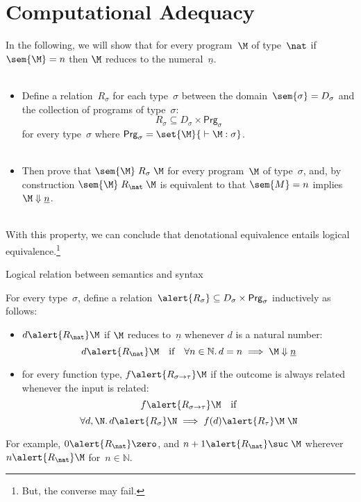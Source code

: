 \section{Computational Adequacy}
\begin{frame}
  In the following, we will show that for every program~$\M$ of type~$\nat$ if
  $\sem{\M} = n$ then $\M$ reduces to the numeral~$\underline{n}$.
  \\~\\
  \begin{itemize}
    \item Define a relation~$R_\sigma$ for each type~$\sigma$ between the
      domain~$\sem{\sigma} = D_\sigma$ and the collection of
      programs of type~$\sigma$:
      \[
        R_\sigma \subseteq D_\sigma \times \mathsf{Prg}_\sigma
      \]
      for every type~$\sigma$ where $\mathsf{Prg}_\sigma = \set{ \M }{{}\vdash
        \M : \sigma}$.
      \\~\\
    \item Then prove that $\sem{\M}\mathrel{R_\sigma} \M$ for every
      program~$\M$ of type~$\sigma$, and, by construction
      $\sem{\M} \mathrel{R_\nat} \M$ is equivalent to that
      $\sem{M} = n$ implies $\M \Downarrow \underline{n}$. 
  \end{itemize}
  ~\\

  With this property, we can conclude that denotational equivalence entails
  logical equivalence.\footnote{
    But, the converse may fail. 
  }
\end{frame}
\begin{frame}{Logical relation between semantics and syntax}
\begin{definition}
  For every type~$\sigma$, define a relation~$\alert{R_\sigma} \subseteq
  D_\sigma \times \mathsf{Prg}_\sigma$ inductively as follows:
  \begin{itemize}
    \item $d \alert{\mathrel{R_\nat}}\M$
      if $\M$ reduces to~$\underline{n}$
      whenever $d$ is a natural number:
      \[
        d \alert{\mathrel{R_\nat}} \M
        \quad\text{if}\quad \forall n \in \mathbb{N}.\,
        d = n \implies \M \Downarrow \underline{n}
      \]
    \item for every function type, $f \alert{\mathrel{R_{\sigma\to\tau}}} \M$
      if the outcome is always related whenever the input is related:
      \[
        f \alert{\mathrel{R_{\sigma\to\tau}}} \M
        \quad\text{if}
      \]
      \[
        \forall d, 
        \N.\, 
        d \alert{\mathrel{R}_\sigma} \N \implies f(d) \alert{\mathrel{R_\tau}} \M\;\N
      \]
  \end{itemize}
\end{definition}
For example, $0 \alert{\mathrel{R_\nat}} \zero$, and
$n + 1 \alert{\mathrel{R_\nat}}
\suc\;\M$ wherever $n \alert{\mathrel{R_\nat}} \M$ for~$n \in \mathbb{N}$. 

\end{frame}
